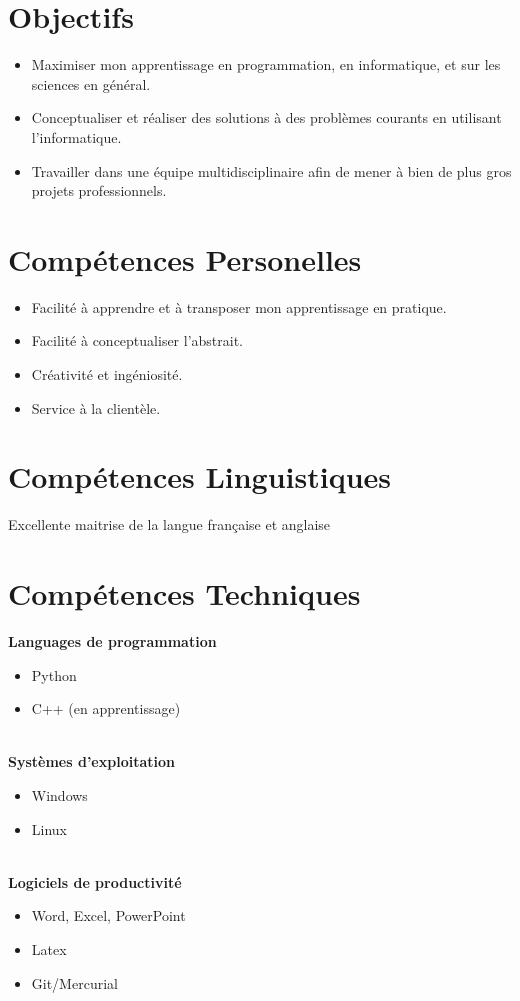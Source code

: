 \documentclass[11pt,a4paper,roman]{moderncv}        %
\begin{document}
\makecvtitle

\section{Objectifs}
\begin{itemize}
\item Maximiser mon apprentissage en programmation, en informatique, et sur les sciences en général.
\item Conceptualiser et réaliser des solutions à des problèmes courants en utilisant l’informatique.
\item Travailler dans une équipe multidisciplinaire afin de mener à bien de plus gros projets professionnels.
\end{itemize}

\section{Compétences Personelles}
\begin{itemize}
\item Facilité à apprendre et à transposer mon apprentissage en pratique.
\item Facilité à conceptualiser l’abstrait.
\item Créativité et ingéniosité.
\item Service à la clientèle.
\end{itemize}

\section{Compétences Linguistiques}
Excellente maitrise de la langue française et anglaise

\section{Compétences Techniques}
{\bfseries Languages de programmation}
\begin{itemize}\item Python \item C++ (en apprentissage)\end{itemize}
\hfill\\
{\bfseries Systèmes d'exploitation}
\begin{itemize}\item Windows \item Linux \end{itemize}
\hfill\\
{\bfseries Logiciels de productivité}
\begin{itemize}\item Word, Excel, PowerPoint\item Latex \item Git/Mercurial\end{itemize}
\end{document}

